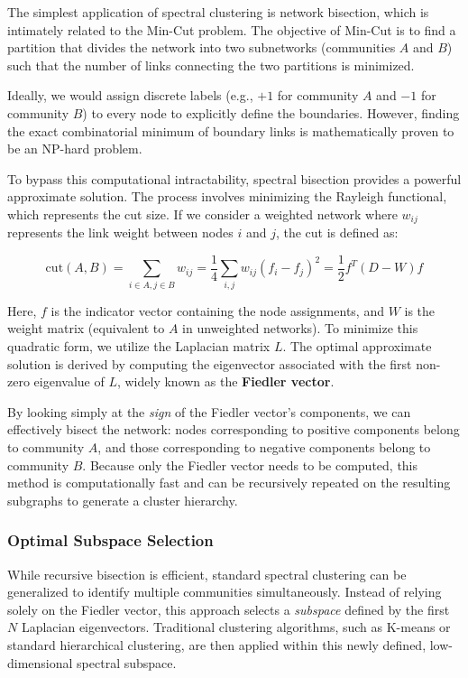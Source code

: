 The simplest application of spectral clustering is network bisection, which is intimately related to the Min-Cut problem. The objective of Min-Cut is to find a partition that divides the network into two subnetworks (communities $A$ and $B$) such that the number of links connecting the two partitions is minimized.

Ideally, we would assign discrete labels (e.g., $+1$ for community $A$ and $-1$ for community $B$) to every node to explicitly define the boundaries. However, finding the exact combinatorial minimum of boundary links is mathematically proven to be an NP-hard problem.

To bypass this computational intractability, spectral bisection provides a powerful approximate solution. The process involves minimizing the Rayleigh functional, which represents the cut size. If we consider a weighted network where $w_{ij}$ represents the link weight between nodes $i$ and $j$, the cut is defined as:

$$\mathrm{cut}(A, B) = \sum_{i \in A, j \in B} w_{ij} = \frac{1}{4} \sum_{i,j} w_{ij}(f_i - f_j)^2 = \frac{1}{2} f^T (D - W) f$$

Here, $f$ is the indicator vector containing the node assignments, and $W$ is the weight matrix (equivalent to $A$ in unweighted networks). To minimize this quadratic form, we utilize the Laplacian matrix $L$. The optimal approximate solution is derived by computing the eigenvector associated with the first non-zero eigenvalue of $L$, widely known as the \textbf{Fiedler vector}.

By looking simply at the \textit{sign} of the Fiedler vector's components, we can effectively bisect the network: nodes corresponding to positive components belong to community $A$, and those corresponding to negative components belong to community $B$. Because only the Fiedler vector needs to be computed, this method is computationally fast and can be recursively repeated on the resulting subgraphs to generate a cluster hierarchy.

\subsubsection{Optimal Subspace Selection}
\label{subsubsec:optimal_subspace}

While recursive bisection is efficient, standard spectral clustering can be generalized to identify multiple communities simultaneously. Instead of relying solely on the Fiedler vector, this approach selects a \textit{subspace} defined by the first $N$ Laplacian eigenvectors. Traditional clustering algorithms, such as K-means or standard hierarchical clustering, are then applied within this newly defined, low-dimensional spectral subspace.

